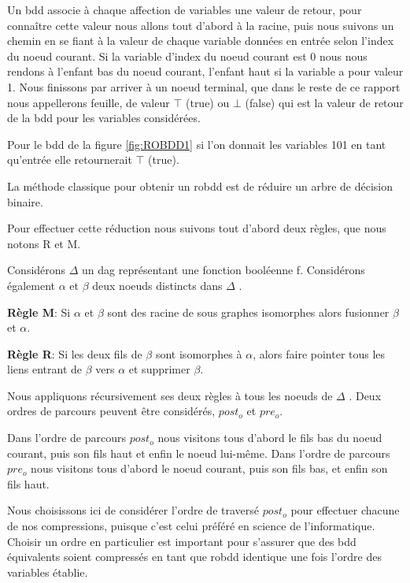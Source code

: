 \documentclass[french]{article}
\begin{document}
Un bdd associe à chaque affection de variables une valeur de retour, pour connaître cette valeur nous allons tout d'abord à la racine, puis nous suivons un chemin en se fiant à la valeur de chaque variable données en entrée selon l'index du noeud courant. Si la variable d'index du noeud courant est 0 nous nous rendons à l'enfant bas du noeud courant, l'enfant haut si la variable a pour valeur 1. Nous finissons par arriver à un noeud terminal, que dans le reste de ce rapport nous appellerons feuille, de valeur \(\top\) (true) ou \(\bot\) (false) qui est la valeur de retour de la bdd pour les variables considérées.

Pour le bdd de la figure \ref{fig:ROBDD1} si l'on donnait les variables 101 en tant qu'entrée elle retournerait \(\top\) (true). 

La méthode classique pour obtenir un robdd est de réduire un arbre de décision binaire. 

Pour effectuer cette réduction nous suivons tout d'abord deux règles, que nous notons R et M.
\vspace{5mm} 

Considérons \(\Delta\) un dag représentant une fonction booléenne f. Considérons également \(\alpha\) et \(\beta\)  deux noeuds distincts dans \(\Delta\) .

\textbf{Règle M}: Si \(\alpha\) et \(\beta\) sont des racine de sous graphes isomorphes alors fusionner \(\beta\) et \(\alpha\).

\textbf{Règle R}: Si les deux fils de \(\beta\) sont isomorphes à \(\alpha\), alors faire pointer tous les liens entrant de \(\beta\) vers \(\alpha\) et supprimer \(\beta\).

Nous appliquons récursivement ses deux règles à tous les noeuds de \(\Delta\) .
\vspace{5mm} 
\newpage
Deux ordres de parcours peuvent être considérés, \(post_{o}\) et \(pre_{o}\).

Dans l'ordre de parcours \(post_{o}\) nous visitons tous d'abord le fils bas du noeud courant, puis son fils haut et enfin le noeud lui-même.
Dans l'ordre de parcours \(pre_{o}\) nous visitons tous d'abord le noeud courant, puis son fils bas, et enfin son fils haut.

Nous choisissons ici de considérer l'ordre de traversé \(post_{o}\) pour effectuer chacune de nos compressions, puisque c'est celui préféré en science de l'informatique. Choisir un ordre en particulier est important pour s'assurer que des bdd équivalents soient compressés en tant que robdd identique une fois l'ordre des variables établie.
\vspace{5mm} 
\end{document}
